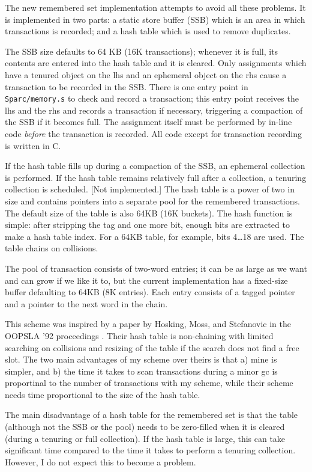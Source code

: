 The new remembered set implementation attempts to avoid all these problems.
It is implemented in two parts: a static store buffer (SSB) which is an area
in which transactions is recorded; and a hash table which is used to 
remove duplicates.

The SSB size defaults to 64 KB (16K transactions); whenever it is full, its
contents are entered into the hash table and it is cleared. Only assignments
which have a tenured object on the lhs and an ephemeral object on the rhs
cause a transaction to be recorded in the SSB. There is one entry point
in {\tt Sparc/memory.s} to check and record a transaction; this entry
point receives the lhs and the rhs and records a transaction if necessary,
triggering a compaction of the SSB if it becomes full. The assignment
itself must be performed by in-line code {\em before} the transaction is
recorded. All code except for transaction recording is written in C.

If the hash table fills up during a compaction of the SSB, an ephemeral
collection is performed. If the hash table remains relatively full after a
collection, a tenuring collection is scheduled. [Not implemented.] The hash
table is a power of two in size and contains pointers into a separate pool
for the remembered transactions.  The default size of the table is also 64KB
(16K buckets). The hash function is simple: after stripping the tag and one
more bit, enough bits are extracted to make a hash table index. For a 64KB
table, for example, bits 4\ldots 18 are used. The table chains on
collisions.

The pool of transaction consists of two-word entries; it can be as large as
we want and can grow if we like it to, but the current implementation has a
fixed-size buffer defaulting to 64KB (8K entries). Each entry consists of a
tagged pointer and a pointer to the next word in the chain.

This scheme was inspired by a paper by Hosking, Moss, and Stefanovic in the
OOPSLA '92 proceedings \cite{remset-paper}. Their hash table is non-chaining
with limited searching on collisions and resizing of the table if the search
does not find a free slot. The two main advantages of my scheme over theirs
is that a) mine is simpler, and b) the time it takes to scan transactions
during a minor gc is proportinal to the number of transactions with my
scheme, while their scheme needs time proportional to the size of the hash
table.

The main disadvantage of a hash table for the remembered set is that the
table (although not the SSB or the pool) needs to be zero-filled when it is
cleared (during a tenuring or full collection). If the hash table is large,
this can take significant time compared to the time it takes to perform a
tenuring collection. However, I do not expect this to become a problem.

